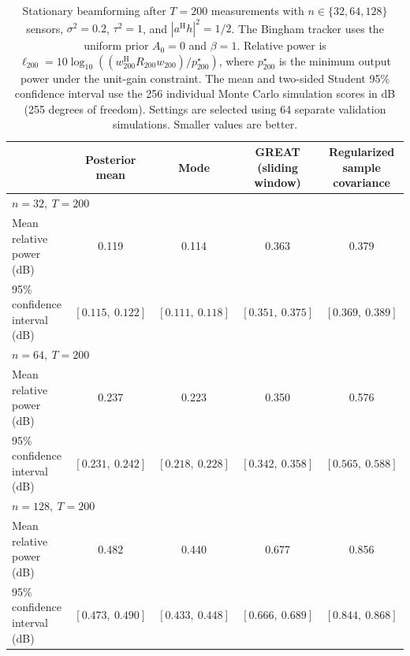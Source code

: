 \begin{table}[t]
\centering
\small
\caption{Stationary beamforming after $T=200$ measurements with $n\in\{32,64,128\}$ sensors, $\sigma^2=0.2$, $\tau^2=1$, and $|a^{\mathrm H}h|^2=1/2$. The Bingham tracker uses the uniform prior $A_0=0$ and $\beta=1$. Relative power is $\ell_{200}=10\log_{10}((w_{200}^{\mathrm H}R_{200}w_{200})/p_{200}^{\star})$, where $p_{200}^{\star}$ is the minimum output power under the unit-gain constraint. The mean and two-sided Student 95\% confidence interval use the 256 individual Monte Carlo simulation scores in dB (255 degrees of freedom). Settings are selected using 64 separate validation simulations. Smaller values are better.}
\label{tab:beamforming-stationary-T200-supp}
\begin{tabular}{@{}lcccc@{}}
\toprule
 & \shortstack{Posterior\\mean} & Mode & \shortstack{GREAT\\(sliding window)} & \shortstack{Regularized sample\\covariance} \\
\midrule
\multicolumn{5}{l}{$n=32,\ T=200$} \\
Mean relative power (dB) & 0.119 & 0.114 & 0.363 & 0.379 \\
95\% confidence interval (dB) & $[0.115,\ 0.122]$ & $[0.111,\ 0.118]$ & $[0.351,\ 0.375]$ & $[0.369,\ 0.389]$ \\
\midrule
\multicolumn{5}{l}{$n=64,\ T=200$} \\
Mean relative power (dB) & 0.237 & 0.223 & 0.350 & 0.576 \\
95\% confidence interval (dB) & $[0.231,\ 0.242]$ & $[0.218,\ 0.228]$ & $[0.342,\ 0.358]$ & $[0.565,\ 0.588]$ \\
\midrule
\multicolumn{5}{l}{$n=128,\ T=200$} \\
Mean relative power (dB) & 0.482 & 0.440 & 0.677 & 0.856 \\
95\% confidence interval (dB) & $[0.473,\ 0.490]$ & $[0.433,\ 0.448]$ & $[0.666,\ 0.689]$ & $[0.844,\ 0.868]$ \\
\bottomrule
\end{tabular}
\end{table}
